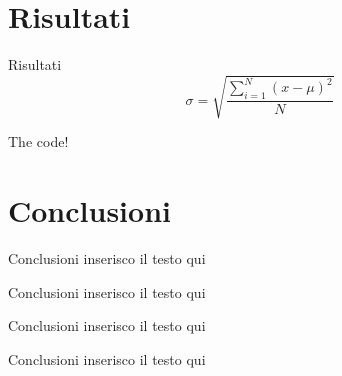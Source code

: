 \documentclass{beamer} %
\begin{document}
\section{Risultati}

        \begin{frame}{Risultati}
            \begin{equation}
                \sigma =\sqrt{\frac{\displaystyle\sum_{i=1}^{N}{(x - \mu)^2}}{N}}
            \end{equation}
        \end{frame}

        \begin{frame}{The code!}
        \end{frame}

\section{Conclusioni}

        \begin{frame}{Conclusioni}
            inserisco il testo qui
        \end{frame}

        \begin{frame}{Conclusioni}
            inserisco il testo qui
        \end{frame}

        \begin{frame}{Conclusioni}
            inserisco il testo qui
        \end{frame}

        \begin{frame}{Conclusioni}
            inserisco il testo qui
        \end{frame}
\end{document}
